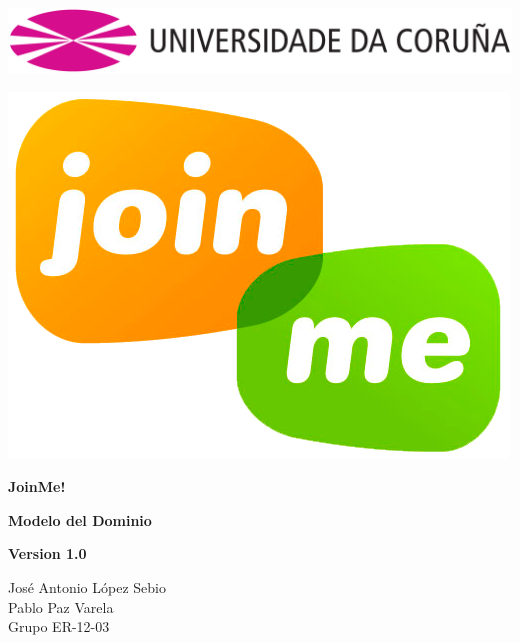 \documentclass[12pt, a4paper, titlepage]{article}
\begin{document}

\begin{titlepage}

\includegraphics[width=15cm]{Imagenes/Simbolo_logo_UDC.png}

\vspace{3cm}

\begin{center}
\includegraphics[scale=0.3]{Imagenes/1a_Practica_ER_14-15.png}
\end{center}


\begin{flushright}
	
	\LARGE{\textbf{ JoinMe!}}
	
	\LARGE{\textbf{Modelo del Dominio}}
	
	\large{\textbf{Version 1.0}}
\end{flushright}

\vspace{1cm}
\begin{center}
José Antonio López Sebio\\
Pablo Paz Varela\\
Grupo ER-12-03\\
\end{center}


\end{titlepage}
\end{document}
